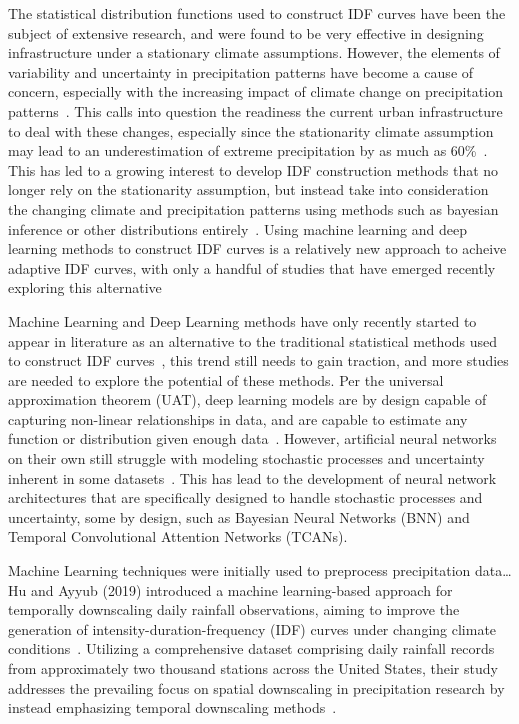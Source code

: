 The statistical distribution functions used to construct IDF curves have been the subject of extensive research, and were found to be very effective in designing infrastructure under a stationary climate assumptions. However, the elements of variability and uncertainty in precipitation patterns have become a cause of concern, especially with the increasing impact of climate change on precipitation patterns~\cite{Cheng2014}. This calls into question the readiness the current urban infrastructure to deal with these changes, especially since the stationarity climate assumption may lead to an underestimation of extreme precipitation by as much as 60\%~\cite{Cheng2014}. This has led to a growing interest to develop IDF construction methods that no longer rely on the stationarity assumption, but instead take into consideration the changing climate and precipitation patterns using methods such as bayesian inference or other distributions entirely~\cite{Cheng2014, hess-2020-173, hess-27-2075-2023, hess-25-6133-2021}. Using machine learning and deep learning methods to construct IDF curves is a relatively new approach to acheive adaptive IDF curves, with only a handful of studies that have emerged recently exploring this alternative~\cite{idfkoya}

\vspace{1em}

Machine Learning and Deep Learning methods have only recently started to appear in literature as an alternative to the traditional statistical methods used to construct IDF curves~\cite{idfkoya}, this trend still needs to gain traction, and more studies are needed to explore the potential of these methods. Per the universal approximation theorem (UAT), deep learning models are by design capable of capturing non-linear relationships in data, and are capable to estimate any function or distribution given enough data~\cite{Goodfellow2016-sect6.4.1}. However, artificial neural networks on their own still struggle with modeling stochastic processes and uncertainty inherent in some datasets~\cite{thacker2020fundamentalissuesregardinguncertainties}. This has lead to the development of neural network architectures that are specifically designed to handle stochastic processes and uncertainty, some by design, such as Bayesian Neural Networks (BNN) and Temporal Convolutional Attention Networks (TCANs).~\cite{lin2021tcan, goan2020} 

\vspace{1em}

Machine Learning techniques were initially used to preprocess precipitation data\dots Hu and Ayyub (2019) introduced a machine learning-based approach for temporally downscaling daily rainfall observations, aiming to improve the generation of intensity-duration-frequency (IDF) curves under changing climate conditions~\cite{geosciences9050209}. Utilizing a comprehensive dataset comprising daily rainfall records from approximately two thousand stations across the United States, their study addresses the prevailing focus on spatial downscaling in precipitation research by instead emphasizing temporal downscaling methods~\cite{geosciences9050209}.


